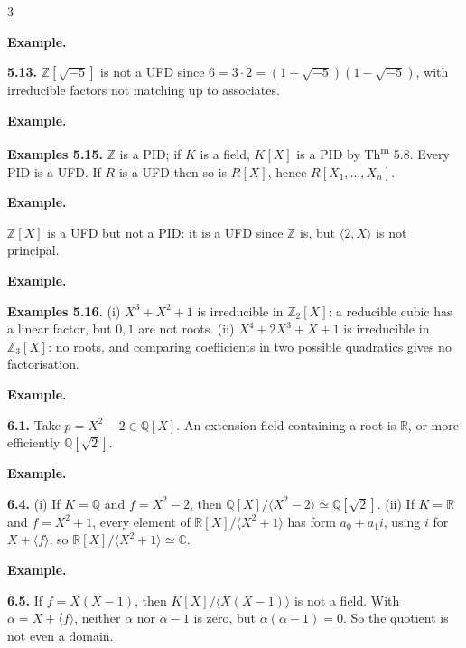 \documentclass[8pt]{extarticle}
\newenvironment{example}{%
  \begin{tcolorbox}[exampleboxstyle]%
  \textbf{Example.}\ \normalfont
  \ignorespaces
}{%
  \end{tcolorbox}%
}
\begin{document}
\begin{multicols*}{3}
        \begin{example}
            \textbf{5.13.} \(\mathbb{Z}[\sqrt{-5}]\) is not a UFD since \(6=3\cdot2=(1+\sqrt{-5})(1-\sqrt{-5})\), with irreducible factors not matching up to associates.
        \end{example}

        \begin{example}
            \textbf{Examples 5.15.}
            \(\mathbb{Z}\) is a PID; if \(K\) is a field, \(K[X]\) is a PID by Th\textsuperscript{m} 5.8. Every PID is a UFD. If \(R\) is a UFD then so is \(R[X]\), hence \(R[X_1,\ldots,X_n]\).
        \end{example}


        \begin{example}
            \(\mathbb{Z}[X]\) is a UFD but not a PID: it is a UFD since \(\mathbb{Z}\) is, but \(\langle2,X\rangle\) is not principal.
        \end{example}

        \begin{example}
            \textbf{Examples 5.16.}
            (i) \(X^3+X^2+1\) is irreducible in \(\mathbb{Z}_2[X]\): a reducible cubic has a linear factor, but \(0,1\) are not roots. (ii) \(X^4+2X^3+X+1\) is irreducible in \(\mathbb{Z}_3[X]\): no roots, and comparing coefficients in two possible quadratics gives no factorisation.
        \end{example}


        \begin{example}
            \textbf{6.1.} Take \(p=X^2-2\in\mathbb{Q}[X]\). An extension field containing a root is \(\mathbb{R}\), or more efficiently \(\mathbb{Q}[\sqrt2]\).
        \end{example}

        \begin{example}
            \textbf{6.4.} (i) If \(K=\mathbb{Q}\) and \(f=X^2-2\), then \(\mathbb{Q}[X]/\langle X^2-2\rangle\simeq\mathbb{Q}[\sqrt2]\). (ii) If \(K=\mathbb{R}\) and \(f=X^2+1\), every element of \(\mathbb{R}[X]/\langle X^2+1\rangle\) has form \(a_0+a_1i\), using \(i\) for \(X+\langle f\rangle\), so \(\mathbb{R}[X]/\langle X^2+1\rangle\simeq\mathbb{C}\).
        \end{example}

        \begin{example}
            \textbf{6.5.} If \(f=X(X-1)\), then \(K[X]/\langle X(X-1)\rangle\) is not a field. With \(\alpha=X+\langle f\rangle\), neither \(\alpha\) nor \(\alpha-1\) is zero, but \(\alpha(\alpha-1)=0\). So the quotient is not even a domain.
        \end{example}


\end{multicols*}
\end{document}
